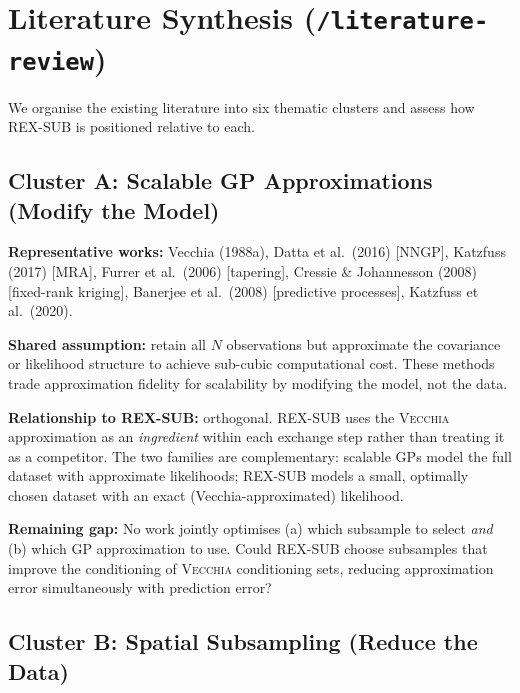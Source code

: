 \documentclass[12pt, a4paper]{article}
\newcommand{\Vecchia}{\textsc{Vecchia}}
\begin{document}
\section{Literature Synthesis (\texttt{/literature-review})}

We organise the existing literature into six thematic clusters and assess how
REX-SUB is positioned relative to each.

\subsection{Cluster A: Scalable GP Approximations (Modify the Model)}

\textbf{Representative works:} Vecchia (1988a), Datta et al.\ (2016) [NNGP],
Katzfuss (2017) [MRA], Furrer et al.\ (2006) [tapering], Cressie \& Johannesson
(2008) [fixed-rank kriging], Banerjee et al.\ (2008) [predictive processes],
Katzfuss et al.\ (2020).

\textbf{Shared assumption:} retain all $N$ observations but approximate the
covariance or likelihood structure to achieve sub-cubic computational cost.  These
methods trade approximation fidelity for scalability by modifying the model, not the
data.

\textbf{Relationship to REX-SUB:} orthogonal.  REX-SUB uses the \Vecchia{}
approximation as an \emph{ingredient} within each exchange step rather than treating
it as a competitor.  The two families are complementary: scalable GPs model the full
dataset with approximate likelihoods; REX-SUB models a small, optimally chosen
dataset with an exact (Vecchia-approximated) likelihood.

\begin{warnbox}
  \textbf{Remaining gap:} No work jointly optimises (a) which subsample to select
  \emph{and} (b) which GP approximation to use.  Could REX-SUB choose subsamples
  that improve the conditioning of \Vecchia{} conditioning sets, reducing
  approximation error simultaneously with prediction error?
\end{warnbox}

\subsection{Cluster B: Spatial Subsampling (Reduce the Data)}
\end{document}
